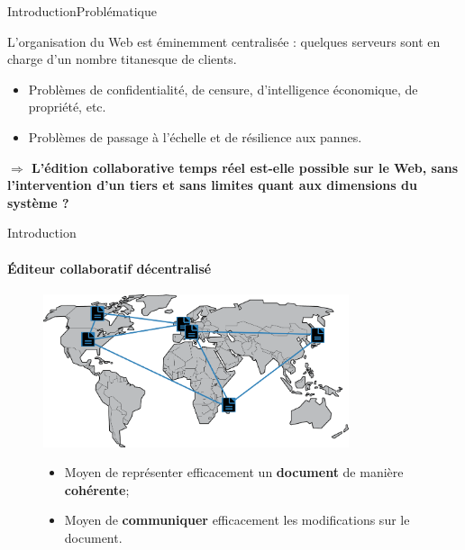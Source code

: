 \begin{frame}{Introduction}{Problématique}

  L'organisation du Web est éminemment centralisée : quelques serveurs sont en
  charge d'un nombre titanesque de clients.
  \begin{itemize}
  \item Problèmes de confidentialité, de censure, d'intelligence économique, de
    propriété, etc.
  \item Problèmes de passage à l'échelle et de résilience aux pannes.
  \end{itemize}
  
  \vspace{1cm}

  \large\textbf{$\Rightarrow$ L'édition collaborative temps réel est-elle
    possible sur le Web, sans l'intervention d'un tiers et sans limites quant
    aux dimensions du système ?}

\end{frame}


\begin{frame}{Introduction}\framesubtitle{Éditeur collaboratif décentralisé}
  \begin{figure}
    \begin{center}
      \includegraphics[width=0.8\textwidth]{img/world.png}
    \end{center}
    
    
    \begin{itemize}
    \item Moyen de représenter efficacement un \textbf{document} de manière
      \textbf{cohérente};
    \item Moyen de \textbf{communiquer} efficacement les modifications sur le
      document.
    \end{itemize}

  \end{figure}

\end{frame}


